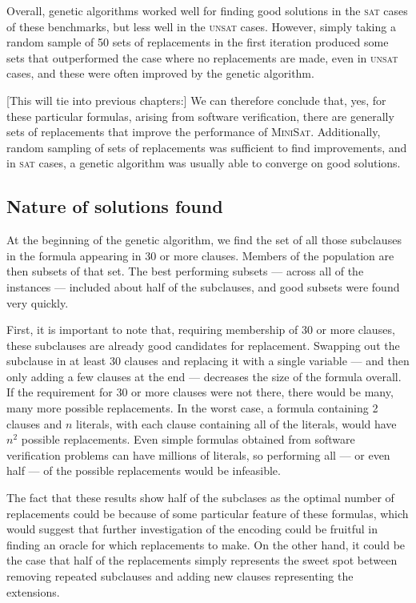 \documentclass[proof,pdftex,11pt,a4,titlepage]{article}
\newcommand{\sat}{\textsc{sat}}
\newcommand{\unsat}{\textsc{unsat}}
\begin{document}
Overall, genetic algorithms worked well for finding good solutions in the \sat{} cases of these benchmarks, but less well in the \unsat{} cases. However, simply taking a random sample of 50 sets of replacements in the first iteration produced some sets that outperformed the case where no replacements are made, even in \unsat{} cases, and these were often improved by the genetic algorithm.

[This will tie into previous chapters:] We can therefore conclude that, yes, for these particular formulas, arising from software verification, there are generally sets of replacements that improve the performance of \textsc{MiniSat}. Additionally, random sampling of sets of replacements was sufficient to find improvements, and in \sat{} cases, a genetic algorithm was usually able to converge on good solutions.

\subsection{Nature of solutions found}

At the beginning of the genetic algorithm, we find the set of all those subclauses in the formula appearing in 30 or more clauses. Members of the population are then subsets of that set. The best performing subsets --- across all of the instances --- included about half of the subclauses, and good subsets were found very quickly.

First, it is important to note that, requiring membership of 30 or more clauses, these subclauses are already good candidates for replacement. Swapping out the subclause in at least 30 clauses and replacing it with a single variable --- and then only adding a few clauses at the end --- decreases the size of the formula overall. If the requirement for 30 or more clauses were not there, there would be many, many more possible replacements. In the worst case, a formula containing 2 clauses and $n$ literals, with each clause containing all of the literals, would have $n^2$ possible replacements. Even simple formulas obtained from software verification problems can have millions of literals, so performing all --- or even half --- of the possible replacements would be infeasible.

The fact that these results show half of the subclases as the optimal number of replacements could be because of some particular feature of these formulas, which would suggest that further investigation of the encoding could be fruitful in finding an oracle for which replacements to make. On the other hand, it could be the case that half of the replacements simply represents the sweet spot between removing repeated subclauses and adding new clauses representing the extensions.
\end{document}
